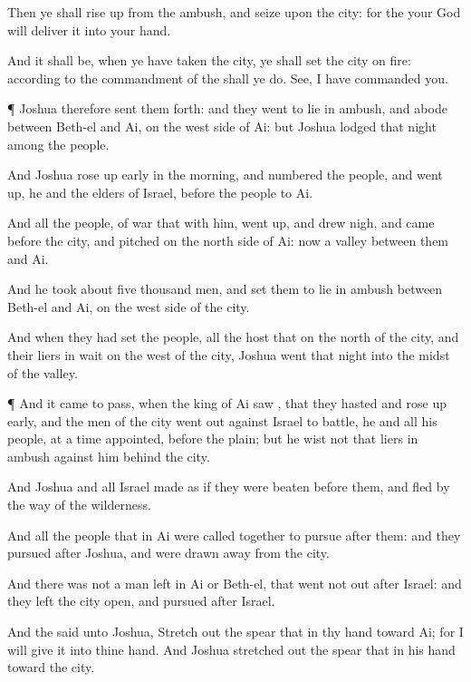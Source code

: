 {Then ye shall rise
up from the
ambush, and
seize upon the
city: for the
{} your
God will
deliver it into your
hand.

And it shall be, when ye have
taken the
city,
{} ye shall
set the
city on
fire: according to the
commandment of the
{} shall ye
do.
See, I have
commanded you.


\par }{\PP {}¶
Joshua therefore sent them
forth: and they
went to lie in
ambush, and
abode between
Beth-el and
Ai, on the west
side of
Ai: but
Joshua
lodged that
night
among the
people.

And
Joshua rose up
early in the
morning, and
numbered the
people, and went
up, he and the
elders of
Israel,
before the
people to
Ai.

And all the
people,
{} of
war that
{} with him, went
up, and drew
nigh, and
came before the
city, and
pitched on the north
side of
Ai: now
{} a
valley between them and
Ai.

And he
took about
five
thousand
men, and
set them to lie in
ambush between
Beth-el and
Ai, on the west
side of the
city.

And when they had
set the
people,
{} all the
host that
{} on the
north of the
city, and their liers in
wait on the
west of the
city,
Joshua
went that
night into the
midst of the
valley.


\par }{\PP {}¶ And it came to pass, when the
king of
Ai
saw
{}, that they
hasted and rose up
early, and the
men of the
city went
out
against
Israel to
battle, he and all his
people, at a time
appointed,
before the
plain; but he
wist not that
{} liers in
ambush against him
behind the
city.

And
Joshua and all
Israel made as if they were
beaten
before them, and
fled by the
way of the
wilderness.

And all the
people that
{} in
Ai were
called together to
pursue
after them: and they
pursued
after
Joshua, and were drawn
away from the
city.

And there was not a
man
left in
Ai or
Beth-el, that went not
out
after
Israel: and they
left the
city
open, and
pursued after
Israel.

And the
{}
said unto
Joshua, Stretch
out the
spear that
{} in thy
hand toward
Ai; for I will
give it into thine
hand. And
Joshua stretched
out the
spear that
{} in his
hand toward the
city.

}
